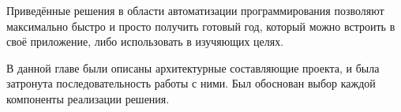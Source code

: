 \tab[0.88cm]Приведённые решения в области автоматизации программирования
позволяют максимально быстро и просто получить готовый год, который можно
встроить в своё приложение, либо использовать в изучяющих целях. 

В данной главе были описаны архитектурные составляющие проекта, и была
затронута последовательность работы с ними. Был обоснован выбор каждой
компоненты реализации решения.
